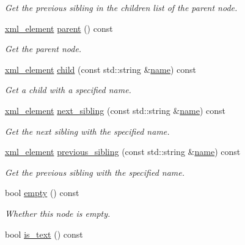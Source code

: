 \begin{DoxyCompactItemize}
\begin{DoxyCompactList}\small\item\em Get the previous sibling in the children list of the parent node. \end{DoxyCompactList}\item 
\hyperlink{classlsl_1_1xml__element}{xml\+\_\+element} \hyperlink{classlsl_1_1xml__element_ae3211be3c10164f366220b638a9dd200}{parent} () const
\begin{DoxyCompactList}\small\item\em Get the parent node. \end{DoxyCompactList}\item 
\hyperlink{classlsl_1_1xml__element}{xml\+\_\+element} \hyperlink{classlsl_1_1xml__element_a111ef129dce406af43948d8c9b915148}{child} (const std\+::string \&\hyperlink{classlsl_1_1xml__element_a2e449e85b7e763b1d0db4bb19d2eb7c2}{name}) const
\begin{DoxyCompactList}\small\item\em Get a child with a specified name. \end{DoxyCompactList}\item 
\hyperlink{classlsl_1_1xml__element}{xml\+\_\+element} \hyperlink{classlsl_1_1xml__element_a100590d2a9822261a3f0b0ed7810134d}{next\+\_\+sibling} (const std\+::string \&\hyperlink{classlsl_1_1xml__element_a2e449e85b7e763b1d0db4bb19d2eb7c2}{name}) const
\begin{DoxyCompactList}\small\item\em Get the next sibling with the specified name. \end{DoxyCompactList}\item 
\hyperlink{classlsl_1_1xml__element}{xml\+\_\+element} \hyperlink{classlsl_1_1xml__element_a70b90853b7edfaebfe69bc1103ed6b8b}{previous\+\_\+sibling} (const std\+::string \&\hyperlink{classlsl_1_1xml__element_a2e449e85b7e763b1d0db4bb19d2eb7c2}{name}) const
\begin{DoxyCompactList}\small\item\em Get the previous sibling with the specified name. \end{DoxyCompactList}\item 
bool \hyperlink{classlsl_1_1xml__element_a787dcaf85abcc5cd4d5f93fc80c82eb5}{empty} () const
\begin{DoxyCompactList}\small\item\em Whether this node is empty. \end{DoxyCompactList}\item 
bool \hyperlink{classlsl_1_1xml__element_a965cfff9a29ebe6d8274f5256ff0017c}{is\+\_\+text} () const

\end{DoxyCompactItemize}
